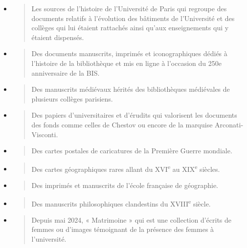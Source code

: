 \documentclass[a4paper,12pt,twoside]{book}
\begin{document}
\begin{itemize}
	\item
	\begin{quote}
		Les sources de l'histoire de l'Université de Paris qui regroupe des
		documents relatifs à l'évolution des bâtiments de l'Université et des
		collèges qui lui étaient rattachés ainsi qu'aux enseignements qui y
		étaient dispensés.
	\end{quote}
	\item
	\begin{quote}
		Des documents manuscrits, imprimés et iconographiques dédiés à
		l'histoire de la bibliothèque et mis en ligne à l'occasion du 250e
		anniversaire de la BIS.
	\end{quote}
	\item
	\begin{quote}
		Des manuscrits médiévaux hérités des bibliothèques médiévales de
		plusieurs collèges parisiens.
	\end{quote}
	\item
	\begin{quote}
		Des papiers d'universitaires et d'érudits qui valorisent les documents
		des fonds comme celles de Chestov ou encore de la marquise
		Arconati-Visconti.
	\end{quote}
	\item
	\begin{quote}
		Des cartes postales de caricatures de la Première Guerre mondiale.
	\end{quote}
	\item
	\begin{quote}
		Des cartes géographiques rares allant du XVI\textsuperscript{e} au
		XIX\textsuperscript{e} siècles.
	\end{quote}
	\item
	\begin{quote}
		Des imprimés et manuscrits de l'école française de géographie.
	\end{quote}
	\item
	\begin{quote}
		Des manuscrits philosophiques clandestins du XVIII\textsuperscript{e}
		siècle.
	\end{quote}
	\item
	\begin{quote}
		Depuis mai 2024, « Matrimoine » qui est une collection d'écrits de
		femmes ou d'images témoignant de la présence des femmes à
		l'université. \\
	\end{quote}
\end{itemize}
\end{document}
